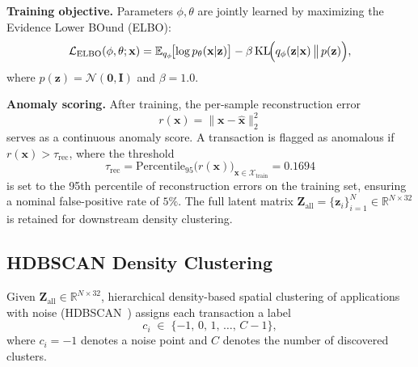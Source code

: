 \noindent\textbf{Training objective.}
Parameters $\phi,\theta$ are jointly learned by maximizing the
Evidence Lower BOund (ELBO):
\begin{equation}
  \mathcal{L}_{\mathrm{ELBO}}(\phi,\theta;\mathbf{x})
    = \mathbb{E}_{q_{\phi}}\!\bigl[\log p_{\theta}(\mathbf{x}|\mathbf{z})\bigr]
      - \beta\,\mathrm{KL}\!\Bigl(q_{\phi}(\mathbf{z}|\mathbf{x})
        \,\big\|\,p(\mathbf{z})\Bigr),
  \label{eq:elbo}
\end{equation}
where $p(\mathbf{z})=\mathcal{N}(\mathbf{0},\mathbf{I})$ and $\beta = 1.0$.

\noindent\textbf{Anomaly scoring.}
After training, the per-sample reconstruction error
\begin{equation}
  r(\mathbf{x})
    = \bigl\|\mathbf{x} - \hat{\mathbf{x}}\bigr\|_{2}^{2}
  \label{eq:recon}
\end{equation}
serves as a continuous anomaly score.
A transaction is flagged as anomalous if
$r(\mathbf{x}) > \tau_{\mathrm{rec}}$, where the threshold
\begin{equation}
  \tau_{\mathrm{rec}}
    = \mathrm{Percentile}_{95}\!\bigl(r(\mathbf{x})\bigr)_{\mathbf{x}\in\mathcal{X}_{\mathrm{train}}}
    = 0.1694
  \label{eq:tau_rec}
\end{equation}
is set to the 95th percentile of reconstruction errors on the training set,
ensuring a nominal false-positive rate of $5\%$.
The full latent matrix
$\mathbf{Z}_{\mathrm{all}} = \{\mathbf{z}_{i}\}_{i=1}^{N}
\in\mathbb{R}^{N\times 32}$
is retained for downstream density clustering.

\subsection{HDBSCAN Density Clustering}
\label{subsec:hdbscan}

\begin{definition}
\label{def:hdbscan}
Given $\mathbf{Z}_{\mathrm{all}}\in\mathbb{R}^{N\times 32}$, hierarchical
density-based spatial clustering of applications with noise
(HDBSCAN~\cite{campello2013density}) assigns each transaction a label
\begin{equation}
  c_{i} \;\in\; \{-1,\,0,\,1,\,\ldots,\,C-1\},
  \label{eq:cluster_label}
\end{equation}
where $c_{i}=-1$ denotes a noise point and $C$ denotes the number of
discovered clusters.
\end{definition}

